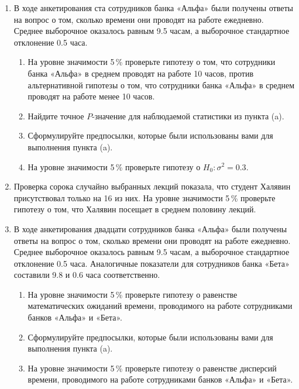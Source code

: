 \documentclass[12pt, a4paper]{article}\usepackage[]{graphicx}\usepackage[]{color}
\begin{document}
		\begin{enumerate}

			\item В ходе анкетирования ста сотрудников банка «Альфа» были получены ответы на вопрос о том, сколько времени они проводят на работе ежедневно. Среднее выборочное оказалось равным 9.5 часам, а выборочное стандартное отклонение 0.5 часа.
			\begin{enumerate}
				\item На уровне значимости 5\,\% проверьте гипотезу о том, что сотрудники банка «Альфа» в среднем проводят на работе 10 часов, против альтернативной гипотезы о том, что сотрудники банка «Альфа» в среднем проводят на работе менее 10 часов.
				\item Найдите точное $P$-значение для наблюдаемой статистики из пункта (a).
				\item Сформулируйте предпосылки, которые были использованы вами для выполнения пункта (a).
				\item На уровне значимости 5\,\% проверьте гипотезу о $H_0 \colon \sigma^2 = 0.3$.
			\end{enumerate}


			\item
			Проверка сорока случайно выбранных лекций показала, что студент Халявин присутствовал только на 16 из них. На уровне значимости 5\,\% проверьте гипотезу о том, что Халявин посещает в среднем половину лекций.

			\item
			В ходе анкетирования двадцати сотрудников банка «Альфа» были получены ответы на вопрос о том, сколько времени они проводят на работе ежедневно. Среднее выборочное оказалось равным 9.5 часам, а выборочное стандартное отклонение 0.5 часа. Аналогичные показатели для сотрудников банка «Бета» составили 9.8 и 0.6 часа соответственно.
			\begin{enumerate}
				\item На уровне значимости 5\,\% проверьте гипотезу о равенстве математических ожиданий времени, проводимого на работе сотрудниками банков «Альфа» и «Бета».
				\item Сформулируйте предпосылки, которые были использованы вами для выполнения пункта (a).
				\item На уровне значимости 5\,\% проверьте гипотезу о равенстве дисперсий времени, проводимого на работе сотрудниками банков «Альфа» и «Бета».
			\end{enumerate}




\end{enumerate}
\end{document}
